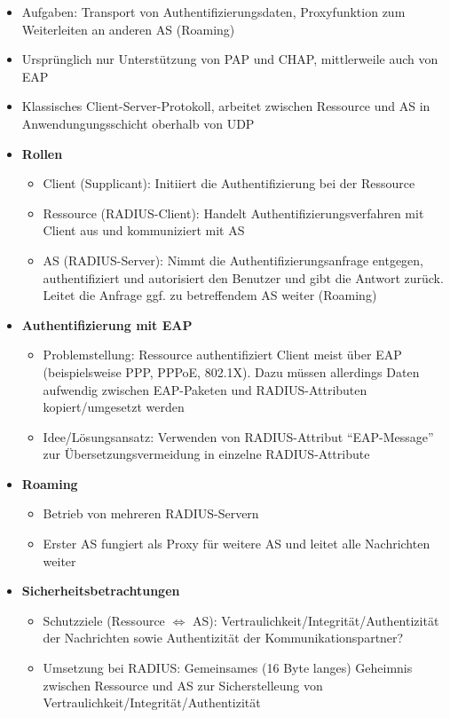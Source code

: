 \begin{itemize}
	\item Aufgaben: Transport von Authentifizierungsdaten, Proxyfunktion zum Weiterleiten an anderen AS (Roaming)
	\item Ursprünglich nur Unterstützung von PAP und CHAP, mittlerweile auch von EAP
	\item Klassisches Client-Server-Protokoll, arbeitet zwischen Ressource und AS in Anwendungungsschicht oberhalb von UDP
	\item \textbf{Rollen}
	\begin{itemize}
		\item Client (Supplicant): Initiiert die Authentifizierung bei der Ressource
		\item Ressource (RADIUS-Client): Handelt Authentifizierungsverfahren mit Client aus und kommuniziert mit AS
		\item AS (RADIUS-Server): Nimmt die Authentifizierungsanfrage entgegen, authentifiziert und autorisiert den Benutzer und gibt die Antwort zurück. Leitet die Anfrage ggf. zu betreffendem AS weiter (Roaming)
	\end{itemize}
	\item \textbf{Authentifizierung mit EAP}
	\begin{itemize}
		\item Problemstellung: Ressource authentifiziert Client meist über EAP (beispielsweise PPP, PPPoE, 802.1X). Dazu müssen allerdings Daten aufwendig zwischen EAP-Paketen und RADIUS-Attributen kopiert/umgesetzt werden
		\item Idee/Lösungsansatz: Verwenden von RADIUS-Attribut "`EAP-Message"' zur Übersetzungsvermeidung in einzelne RADIUS-Attribute
	\end{itemize}
	\item \textbf{Roaming}
	\begin{itemize}
		\item Betrieb von mehreren RADIUS-Servern
		\item Erster AS fungiert als Proxy für weitere AS und leitet alle Nachrichten weiter
	\end{itemize}
	\item \textbf{Sicherheitsbetrachtungen}
	\begin{itemize}
		\item Schutzziele (Ressource \(\Leftrightarrow\) AS): Vertraulichkeit/Integrität/Authentizität der Nachrichten sowie Authentizität der Kommunikationspartner?
		\item Umsetzung bei RADIUS: Gemeinsames (16 Byte langes) Geheimnis zwischen Ressource und AS zur Sicherstelleung von Vertraulichkeit/Integrität/Authentizität

\end{itemize}
\end{itemize}
